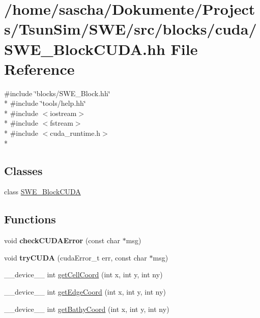 \hypertarget{SWE__BlockCUDA_8hh}{\section{/home/sascha/\-Dokumente/\-Projects/\-Tsun\-Sim/\-S\-W\-E/src/blocks/cuda/\-S\-W\-E\-\_\-\-Block\-C\-U\-D\-A.hh File Reference}
\label{SWE__BlockCUDA_8hh}
}
{\ttfamily \#include \char`\"{}blocks/\-S\-W\-E\-\_\-\-Block.\-hh\char`\"{}}\\*
{\ttfamily \#include \char`\"{}tools/help.\-hh\char`\"{}}\\*
{\ttfamily \#include $<$iostream$>$}\\*
{\ttfamily \#include $<$fstream$>$}\\*
{\ttfamily \#include $<$cuda\-\_\-runtime.\-h$>$}\\*
\subsection*{Classes}
\begin{DoxyCompactItemize}
\item 
class \hyperlink{classSWE__BlockCUDA}{S\-W\-E\-\_\-\-Block\-C\-U\-D\-A}
\end{DoxyCompactItemize}
\subsection*{Functions}
\begin{DoxyCompactItemize}
\item 
\hypertarget{SWE__BlockCUDA_8hh_a3b360c7adecc62da0141b3c82e753c77}{void {\bfseries check\-C\-U\-D\-A\-Error} (const char $\ast$msg)}\label{SWE__BlockCUDA_8hh_a3b360c7adecc62da0141b3c82e753c77}

\item 
\hypertarget{SWE__BlockCUDA_8hh_a0cda924127c6de7246554ed6b80917e5}{void {\bfseries try\-C\-U\-D\-A} (cuda\-Error\-\_\-t err, const char $\ast$msg)}\label{SWE__BlockCUDA_8hh_a0cda924127c6de7246554ed6b80917e5}

\item 
\-\_\-\-\_\-device\-\_\-\-\_\- int \hyperlink{SWE__BlockCUDA_8hh_a851d73679072ec13f3e3a9bd9dd4ddcc}{get\-Cell\-Coord} (int x, int y, int ny)
\item 
\-\_\-\-\_\-device\-\_\-\-\_\- int \hyperlink{SWE__BlockCUDA_8hh_acbd2e57b95983dbef453451ff7ddf9bb}{get\-Edge\-Coord} (int x, int y, int ny)
\item 
\-\_\-\-\_\-device\-\_\-\-\_\- int \hyperlink{SWE__BlockCUDA_8hh_add74cf6e6e3f322a5948a74fc7183cde}{get\-Bathy\-Coord} (int x, int y, int ny)
\end{DoxyCompactItemize}
